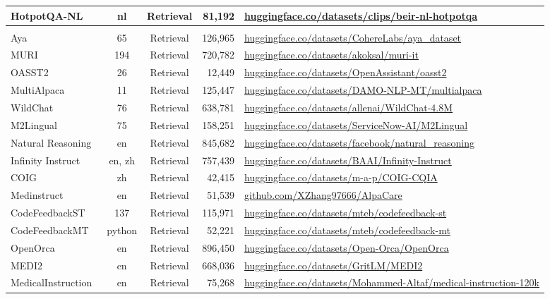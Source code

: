 \begin{table}[th]
{\begin{tabular}{lccrm{9cm}}
HotpotQA-NL~\citep{2025beir-nl} & nl & Retrieval & 81,192 & \url{huggingface.co/datasets/clips/beir-nl-hotpotqa} \\
\midrule
\rowcolor{gray!15} \multicolumn{5}{c}{Instruction Data}\\
Aya~\citep{2024aya} & 65 & Retrieval & 126,965 & \url{huggingface.co/datasets/CohereLabs/aya_dataset} \\
MURI~\citep{2025muri} & 194 & Retrieval & 720,782 & \url{huggingface.co/datasets/akoksal/muri-it} \\
OASST2~\citep{2023oasst2} & 26 & Retrieval & 12,449 & \url{huggingface.co/datasets/OpenAssistant/oasst2} \\
MultiAlpaca~\citep{2023multialpaca} & 11 & Retrieval & 125,447 & \url{huggingface.co/datasets/DAMO-NLP-MT/multialpaca} \\
WildChat~\cite{2024wildchat} & 76 & Retrieval & 638,781 & \url{huggingface.co/datasets/allenai/WildChat-4.8M} \\
M2Lingual~\citep{2025m2lingual} & 75 & Retrieval & 158,251 & \url{huggingface.co/datasets/ServiceNow-AI/M2Lingual} \\
Natural Reasoning~\citep{2025naturalreasoning} & en & Retrieval & 845,682 & \url{huggingface.co/datasets/facebook/natural_reasoning} \\
Infinity Instruct~\citep{2025infinityinstruct} & en, zh & Retrieval & 757,439 & \url{huggingface.co/datasets/BAAI/Infinity-Instruct} \\
COIG~\citep{2025coig} & zh & Retrieval & 42,415 & \url{huggingface.co/datasets/m-a-p/COIG-CQIA} \\
Medinstruct~\citep{2023medinstruct} & en & Retrieval & 51,539 & \url{github.com/XZhang97666/AlpaCare} \\
CodeFeedbackST~\citep{2025CoIR} & 137 & Retrieval & 115,971 & \url{huggingface.co/datasets/mteb/codefeedback-st} \\
CodeFeedbackMT~\citep{2025CoIR} & python & Retrieval & 52,221 & \url{huggingface.co/datasets/mteb/codefeedback-mt} \\
OpenOrca~\citep{2023openorca} & en & Retrieval & 896,450 & \url{huggingface.co/datasets/Open-Orca/OpenOrca} \\
MEDI2~\citep{2025medi2} & en & Retrieval & 668,036 & \url{huggingface.co/datasets/GritLM/MEDI2} \\
MedicalInstruction~\citep{2023MedicalInstruction} & en & Retrieval & 75,268 & \url{huggingface.co/datasets/Mohammed-Altaf/medical-instruction-120k} \\

\end{tabular}}
\end{table}
